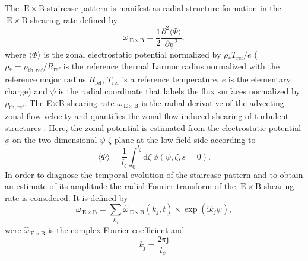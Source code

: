 \documentclass[aip, amsmath, amssymb, reprint, twocolumn]{revtex4-1}
\begin{document}
The ${\mathrm{\:E}\times\mathrm{B}}$ staircase pattern is manifest as radial structure formation in the ${\mathrm{\:E}\times\mathrm{B}}$ shearing rate defined by\cite{rath2016, doi:10.1063/1.3005380, rath2016, peeters2016}
\begin{equation}
	\omega_{\mathrm{\:E \times B}} = \frac{1}{2} \frac{\partial^2 \langle \Phi \rangle}{\partial \psi^2},
	\label{eq:shearingrate}
\end{equation}
where $\langle \Phi \rangle$ is the zonal electrostatic potential normalized by $\rho_\ast T_\mathrm{ref}/e$ ($\rho_\ast = \rho_\mathrm{th,ref}/R_\mathrm{ref}$ is the reference thermal Larmor radius normalized with the reference major radius $R_\mathrm{ref}$, $T_\mathrm{ref}$ is a reference temperature, $e$ is the elementary charge) and $\psi$ is the radial coordinate that labels the flux surfaces normalized by $\rho_\mathrm{th,ref}$.
The E$\times$B shearing rate $\omega_{\mathrm{\:E \times B}}$ is the radial derivative of the advecting zonal flow velocity \cite{doi:10.1063/1.871313, doi:10.1063/1.872847} and quantifies the zonal flow induced shearing of turbulent structures \cite{doi:10.1063/1.859529, doi:10.1063/1.871313, doi:10.1063/1.872367}. 
Here, the zonal potential is estimated from the electrostatic potential $\phi$ on the two dimensional $\psi$-$\zeta$-plane at the low field side according to
\begin{equation}
\langle \Phi \rangle = \frac{1}{l_\zeta} \int_0^{l_\zeta} \mathrm{d}\zeta ~ \phi(\psi,\zeta,s=0).
\end{equation}
In order to diagnose the temporal evolution of the staircase pattern and to obtain an estimate of its amplitude the radial Fourier transform of the ${\mathrm{\:E}\times\mathrm{B}}$ shearing rate is considered. 
It is defined by
\begin{equation}
	\omega_{\mathrm{\:E \times B}} = \sum_{k_j} \hat \omega_{\mathrm{\:E \times B}}(k_j,t) \times \exp(\mathrm{i} k_j \psi),
	\label{eq:shearingrate_fourier}
\end{equation}
were $\hat \omega_{\mathrm{\:E \times B}}$ is the complex Fourier coefficient and 
\begin{equation}
	k_\mathrm{j} = \frac{2\pi \mathrm{j}}{l_\psi}
\end{equation}
\end{document}
